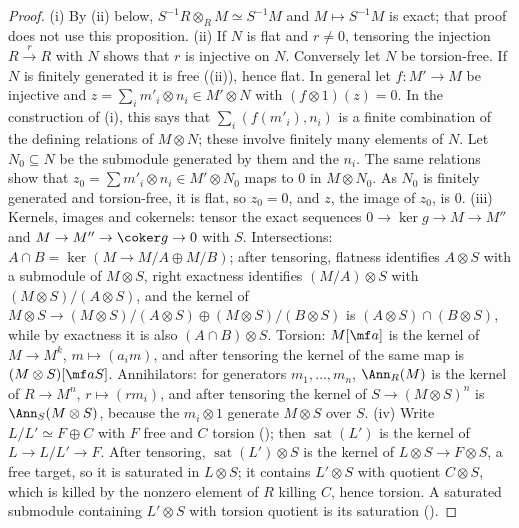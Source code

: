 \begin{proof}
(i) By (ii) below, $S^{-1}R\otimes_RM\simeq S^{-1}M$ and $M\mapsto S^{-1}M$ is exact; that proof does not use
this proposition.
(ii) If $N$ is flat and $r\ne0$, tensoring the injection $R\xrightarrow{r}R$ with $N$ shows that $r$ is injective on $N$. Conversely let
$N$ be torsion-free. If $N$ is finitely generated it is free ((ii)), hence flat. In general let
$f\colon M'\to M$ be injective and $z=\sum_im'_i\otimes n_i\in M'\otimes N$ with $(f\otimes1)(z)=0$. In the construction of
(i), this says that $\sum_i(f(m'_i),n_i)$ is a finite combination of the defining relations of
$M\otimes N$; these involve finitely many elements of $N$. Let $N_0\subseteq N$ be the submodule generated by them and the
$n_i$. The same relations show that $z_0=\sum m'_i\otimes n_i\in M'\otimes N_0$ maps to $0$ in $M\otimes N_0$. As $N_0$ is finitely
generated and torsion-free, it is flat, so $z_0=0$, and $z$, the image of $z_0$, is $0$.
(iii) Kernels, images and cokernels: tensor the exact sequences $0\to\ker g\to M\to M''$ and $M\to M''\to\coker g\to0$ with
$S$. Intersections: $A\cap B=\ker(M\to M/A\oplus M/B)$; after tensoring, flatness identifies $A\otimes S$ with a submodule of $M\otimes S$,
right exactness identifies $(M/A)\otimes S$ with $(M\otimes S)/(A\otimes S)$, and the kernel of $M\otimes S\to(M\otimes S)/(A\otimes S)\oplus(M\otimes S)/(B\otimes S)$ is
$(A\otimes S)\cap(B\otimes S)$, while by exactness it is also $(A\cap B)\otimes S$. Torsion: $M[\mf a]$ is the kernel of $M\to M^k$, $m\mapsto(a_im)$, and
after tensoring the kernel of the same map is $(M\otimes S)[\mf aS]$. Annihilators: for generators $m_1,\dots,m_n$,
$\Ann_R(M)$ is the kernel of $R\to M^n$, $r\mapsto(rm_i)$, and after tensoring the kernel of $S\to(M\otimes S)^n$ is
$\Ann_S(M\otimes S)$, because the $m_i\otimes1$ generate $M\otimes S$ over $S$.
(iv) Write $L/L'\simeq F\oplus C$ with $F$ free and $C$ torsion (); then $\operatorname{sat}(L')$ is the
kernel of $L\to L/L'\to F$. After tensoring, $\operatorname{sat}(L')\otimes S$ is the kernel of $L\otimes S\to F\otimes S$, a free target, so it is
saturated in $L\otimes S$; it contains $L'\otimes S$ with quotient $C\otimes S$, which is killed by the nonzero element of $R$ killing
$C$, hence torsion. A saturated submodule containing $L'\otimes S$ with torsion quotient is its saturation
().
\end{proof}

